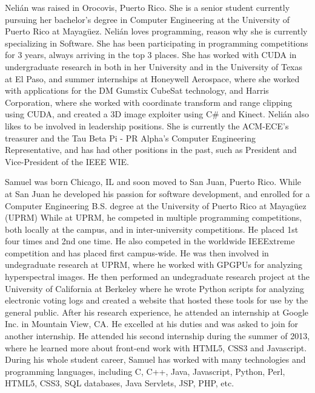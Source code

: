 \label{sec:bios}


Nelián was raised in Orocovis, Puerto Rico. She is a senior
student currently pursuing her bachelor's degree in Computer Engineering at the
University of Puerto Rico at Mayagüez. Nelián loves programming,
reason why she is currently specializing in Software. She
has been participating in programming competitions for 3 years, always arriving in the top 3 places. She has worked with CUDA in
undergraduate research in both in her University and in the University of Texas at
El Paso,  and summer internships at
Honeywell Aerospace, where she worked with applications for the DM Gumstix CubeSat technology, and Harris Corporation, where she worked with coordinate transform and range clipping using CUDA, and created a 3D image exploiter using C\# and Kinect. Nelián also likes to be
involved in leadership positions.  She is currently the ACM-ECE's treasurer and
the Tau Beta Pi - PR Alpha's Computer Engineering Representative, and has had
other positions in the past, such as President and Vice-President of the IEEE
WIE.


Samuel was born Chicago, IL and soon moved to San Juan, Puerto Rico. While at
San Juan he developed his passion for software development, and enrolled for a
Computer Engineering B.S. degree at the University of Puerto Rico at Mayagüez
(UPRM) While at UPRM, he competed in multiple programming competitions, both
locally at the campus, and in inter-university competitions. He placed 1st four
times and 2nd one time. He also competed in the worldwide IEEExtreme competition
and has placed first campus-wide. He was then involved in undegraduate research
at UPRM, where he worked with GPGPUs for analyzing hyperspectral images. He then
performed an undegraduate research project at the University of California at
Berkeley where he wrote Python scripts for analyzing electronic voting logs and
created a website that hosted these tools for use by the general public. After
his research experience, he attended an internship at Google Inc. in Mountain
View, CA. He excelled at his duties and was asked to join for another
internship. He attended his second internship during the summer of 2013, where
he learned more about front-end work with HTML5, CSS3 and Javascript. During his
whole student career, Samuel has worked with many technologies and programming
languages, including C, C++, Java, Javascript, Python, Perl, HTML5, CSS3, SQL
databases, Java Servlets, JSP, PHP, etc.


